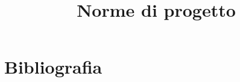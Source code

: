 \documentclass[12pt]{article}
\title{Norme di progetto}
\begin{document}
	\makefirstpage
	
	
	\clearpage
	
	\tableofcontents
	\clearpage
	
	
	


	\clearpage
	\section{Bibliografia}
		
		
\end{document}
